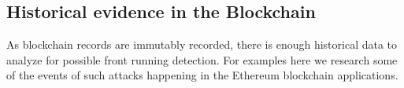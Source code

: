 %
%
%
%
%


\subsection{Historical evidence in the Blockchain}
As blockchain records are immutably recorded, there is enough historical data to analyze for possible front running detection. For examples here we research some of the events of such attacks happening in the Ethereum blockchain applications.


